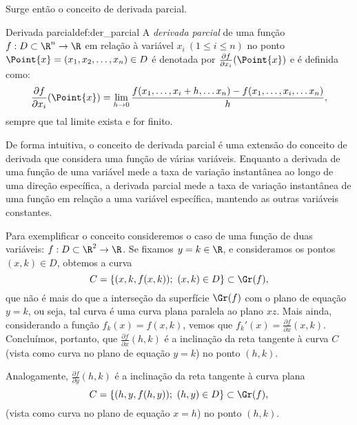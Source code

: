 Surge então o conceito de derivada parcial. 
\begin{definition}{Derivada parcial}{def:der_parcial}
A \textit{derivada parcial} de uma função \( f:D\subset\R^n\to\R \) em relação à variável \( x_i~(1\leq i \leq n) \) no ponto $\Point{x}=(x_1,x_2,\dots,x_n)\in D$ é denotada por \( \frac{\partial f}{\partial x_i} (\Point{x})\) e é definida como:
\[ \frac{\partial f}{\partial x_i} (\Point{x}) = \lim_{{h \to 0}} \frac{f(x_1,\dots,x_i + h,\dots x_n) - f(x_1,\dots,x_i,\dots x_n)}{h},\]
sempre que tal limite exista e for finito. 
\end{definition}

De forma intuitiva, o conceito de derivada parcial é uma extensão do conceito de derivada que considera uma função de várias variáveis. Enquanto a derivada de uma função de uma variável mede a taxa de variação instantânea ao longo de uma direção específica, a derivada parcial mede a taxa de variação instantânea de uma função em relação a uma variável específica, mantendo as outras variáveis constantes. 

Para exemplificar o conceito consideremos o caso de uma função de duas variáveis: $f:D\subset\R^2\to\R$. Se fixamos $y=k\in\R$, e consideramos os pontos $(x,k)\in D$, obtemos a curva
$$C=\{(x,k,f(x,k));~(x,k)\in D\}\subset \Gr(f),$$
que não é mais do que a interseção da superfície $\Gr(f)$ com o plano de equação $y=k$, ou seja, tal curva é uma curva plana paralela ao plano $xz$. Mais ainda, considerando a função $f_k(x)=f(x,k)$, vemos que $f_k'(x)=\frac{\partial f}{\partial x}(x,k)$. Concluímos, portanto, que  $\frac{\partial f}{\partial x}(h,k)$ é a inclinação da reta tangente à curva $C$ (vista como curva no plano de equação $y=k$) no ponto $(h,k)$. 



Analogamente, $\frac{\partial f}{\partial y}(h,k)$ é a inclinação da reta tangente à curva plana 
$$C=\{(h,y,f(h,y));~(h,y)\in D\}\subset \Gr(f),$$
(vista como curva no plano de equação $x=h$) no ponto $(h,k)$. 

